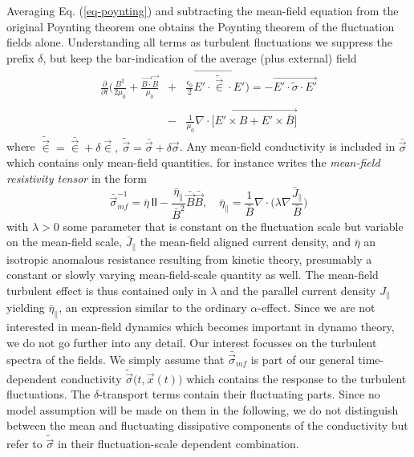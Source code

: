 \documentclass[ ]{copernicus2}
\begin{document}
{Averaging Eq. (\ref{eq-poynting}) and subtracting the mean-field equation from the original Poynting theorem one obtains the Poynting theorem of the fluctuation fields alone. Understanding all terms as turbulent fluctuations we suppress the prefix $\delta$, but keep the bar-indication of the average (plus external) field
\begin{eqnarray}\label{eq-fluct-one}
\frac{\partial}{\partial t}\Big(\frac{B^2}{2\mu_0}+\frac{\vec{B\cdot}\vec{\bar{B}}}{\mu_0}&+&\frac{\epsilon_0}{2}\vec{E'\cdot\tilde{\vec{\in}}\cdot E'}\Big)=-\vec{E'\cdot\tilde{\sigma}\cdot E'}\nonumber\\[-1.5ex]
&&\\[-1.5ex]
&-&\frac{1}{\mu_0}\vec{\nabla\cdot\Big[E'\times B+E'\times\bar{B}\Big]}\nonumber
\end{eqnarray}
where $\tilde{\vec{\in}}=\bar{\vec{\in}}+\delta{\vec{\in}},\ \tilde{\vec\sigma}=\bar{\vec\sigma}+\delta\vec{\sigma}$. Any mean-field conductivity \citep{boozer1986} is included in $\bar{\vec{\sigma}}$ which contains only mean-field quantities. {\citet{boozer1986} for instance writes the \emph{mean-field resistivity tensor} in the form
\begin{displaymath}
\bar{\vec{\sigma}}^{-1}_\mathit{mf}= \bar{\eta}\, \textsf{I}\!\!\!\!\!\textsf{I}-\frac{\bar{\eta}_\|}{\bar{B}^2}\bar{\vec{B}}\bar{\vec{B}},\quad \bar{\eta}_\|=\frac{1}{\bar{B}}\nabla\cdot\Big(\lambda\nabla\frac{\bar{J}_\|}{\bar{B}}\Big)\nonumber
\end{displaymath}
with $\lambda>0$ some parameter that is constant on the fluctuation scale but variable on the mean-field scale, $\bar{J}_\|$ the mean-field aligned current density, and $\bar{\eta}$ an isotropic anomalous resistance resulting from kinetic theory, presumably a constant or slowly varying mean-field-scale quantity as well. The mean-field turbulent effect is thus contained only in $\lambda$ and the parallel current density $J_\|$ yielding $\bar{\eta}_\|$, an expression similar to the ordinary $\alpha$-effect. Since we are not interested in mean-field dynamics which becomes important in dynamo theory, we do not go further into any detail. Our interest focusses on the turbulent spectra of the fields. We simply assume that $\bar{\vec{\sigma}}_\mathit{mf}$ is part of our general time-dependent conductivity $\tilde{\vec{\sigma}}\big(t,\vec{x}(t)\big)$ which contains the response to the turbulent fluctuations. The $\delta$-transport terms contain their fluctuating parts. Since no model assumption will be made on them in the following, we do not distinguish between the mean and fluctuating dissipative components of the conductivity but refer to $\tilde{\vec{\sigma}}$ in their fluctuation-scale dependent combination.}


}
\end{document}
